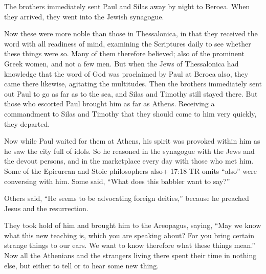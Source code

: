  The brothers immediately sent Paul and Silas away by night
to Beroea. When they arrived, they went into the Jewish synagogue.

 Now these were more noble than those in Thessalonica, in
that they received the word with all readiness of mind, examining the
Scriptures daily to see whether these things were so.  Many
of them therefore believed; also of the prominent Greek women, and not a
few men.  But when the Jews of Thessalonica had knowledge
that the word of God was proclaimed by Paul at Beroea also, they came
there likewise, agitating the multitudes.  Then the
brothers immediately sent out Paul to go as far as to the sea, and Silas
and Timothy still stayed there.  But those who escorted
Paul brought him as far as Athens. Receiving a commandment to Silas and
Timothy that they should come to him very quickly, they departed.

 Now while Paul waited for them at Athens, his spirit was
provoked within him as he saw the city full of idols.  So
he reasoned in the synagogue with the Jews and the devout persons, and
in the marketplace every day with those who met him.  Some
of the Epicurean and Stoic philosophers also+ 17:18 TR omits ``also''
were conversing with him. Some said, ``What does this babbler want to
say?''

Others said, ``He seems to be advocating foreign deities,'' because he
preached Jesus and the resurrection.

 They took hold of him and brought him to the Areopagus,
saying, ``May we know what this new teaching is, which you are speaking
about?  For you bring certain strange things to our ears.
We want to know therefore what these things mean.''  Now
all the Athenians and the strangers living there spent their time in
nothing else, but either to tell or to hear some new thing.

